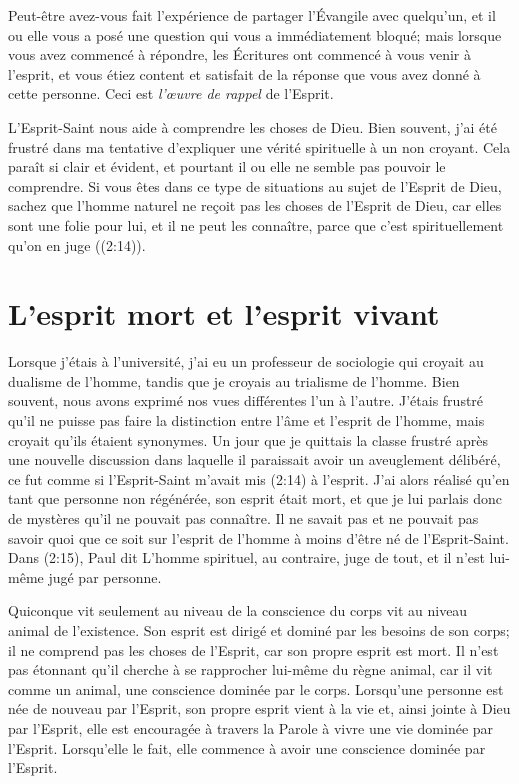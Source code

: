 Peut-être avez-vous fait l'expérience de partager l'Évangile avec quelqu'un,
 et il ou elle vous a posé une question qui vous a immédiatement bloqué;
 mais lorsque vous avez commencé à répondre, les Écritures ont commencé
 à vous venir à l'esprit, et vous étiez content et satisfait de la réponse
 que vous avez donné à cette personne. Ceci est \emph{l'œuvre de rappel}
 de l'Esprit.

L'Esprit-Saint nous aide à comprendre les choses de Dieu.
 Bien souvent, j'ai été frustré dans ma tentative d'expliquer
 une vérité spirituelle à un non croyant.
 Cela paraît si clair et évident, et pourtant il ou elle ne semble pas
 pouvoir le comprendre.
 Si vous êtes dans ce type de situations au sujet de l'Esprit de Dieu,
 sachez que l'homme naturel \Og ne reçoit pas les choses de l'Esprit de Dieu,
 car elles sont une folie pour lui, et il ne peut les connaître, 
 parce que c'est spirituellement qu'on en juge \Fg{}
 ((2:14)).


\section{L'esprit mort et l'esprit vivant}

Lorsque j'étais à l'université, j'ai eu un professeur de sociologie
 qui croyait au dualisme de l'homme, tandis que je croyais au trialisme de l'homme.
 Bien souvent, nous avons exprimé nos vues différentes l'un à l'autre.
 J'étais frustré qu'il ne puisse pas faire la distinction entre l'âme
 et l'esprit de l'homme, mais croyait qu'ils étaient synonymes.
 Un jour que je quittais la classe frustré
 après une nouvelle discussion dans laquelle il paraissait
 avoir un aveuglement délibéré, ce fut comme si l'Esprit-Saint
 m'avait mis (2:14) à l'esprit.
 J'ai alors réalisé qu'en tant que
 personne non régénérée, son esprit était mort,
 et que je lui parlais donc de mystères qu'il ne
 pouvait pas connaître.
 Il ne savait pas et ne
 pouvait pas savoir quoi que ce soit sur l'esprit
 de l'homme à moins d'être né de l'Esprit-Saint.
 Dans (2:15), Paul dit\frcolon{}
 \Og L'homme spirituel, au contraire, juge de tout,
 et il n'est lui-même jugé par personne. \Fg{}

Quiconque vit seulement au niveau de la conscience du corps
 vit au niveau animal de l'existence.
 Son esprit est dirigé et dominé par les besoins de son corps;
 il ne comprend pas les choses de l'Esprit, car son propre esprit est mort.
 Il n'est pas étonnant qu'il cherche à se rapprocher lui-même
 du règne animal, car il vit comme un animal,
 une conscience dominée par le corps.
 Lorsqu'une personne est née de nouveau par l'Esprit,
 son propre esprit vient à la vie et, ainsi jointe à Dieu par l'Esprit,
 elle est encouragée à travers la Parole à vivre une vie dominée par l'Esprit.
 Lorsqu'elle le fait, elle commence à avoir une conscience dominée par l'Esprit.


